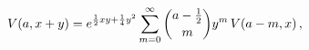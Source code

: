 \[\mathop{V\/}\nolimits\!\left(a,x+y\right)=e^{\frac{1}{2}xy+\frac{1}{4}y^{2}}%
\sum_{m=0}^{\infty}\binom{a-\tfrac{1}{2}}{m}y^{m}\mathop{V\/}\nolimits\!\left(%
a-m,x\right),\]